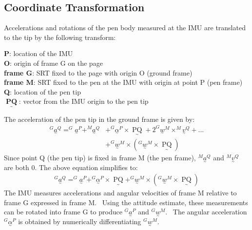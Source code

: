 \documentclass{article}
\newcommand{\nosymbol}{}
\newcommand{\tmop}[1]{\ensuremath{\operatorname{#1}}}
\begin{document}
\subsection{Coordinate Transformation}
Accelerations and rotations of the pen body measured at the IMU are translated to the tip by the following transform:

\textbf{P}: location of the IMU \\
\textbf{O}: origin of frame G on the page \\
\textbf{frame G}: SRT fixed to the page with origin O (ground frame) \\
\textbf{frame M}: SRT fixed to the pen at the IMU with origin at point P (pen frame) \\
\textbf{Q}: location of the pen tip \\
$\underset{\mbox{\textasciitilde}}{\tmop{\textbf{PQ}}}$: vector from the IMU origin to
the pen tip

The acceleration of the pen tip in the ground frame is given by:
\begin{align*}
  ^G \underset{\mbox{\textasciitilde}}{a}^Q =^G
  \underset{\mbox{\textasciitilde}}{a}^P +^M
  \underset{\mbox{\textasciitilde}}{a}^Q &+^G
  \underset{\mbox{\textasciitilde}}{\alpha}^P \times
  \underset{\mbox{\textasciitilde}}{\tmop{PQ}} + 2^G
  \underset{\mbox{\textasciitilde}}{w}^M \times^M
  \underset{\mbox{\textasciitilde}}{v}^Q + ... \\ &+ ^G 
  \underset{\mbox{\textasciitilde}}{w}^M \times \left(^G
  \underset{\mbox{\textasciitilde}}{w}^M \times
  \underset{\mbox{\textasciitilde}}{\tmop{PQ}} \right)
\end{align*}
Since point Q (the pen tip) is fixed in frame M (the pen frame), $^M
\underset{\mbox{\textasciitilde}}{a}^Q$ and $^M
\underset{\mbox{\textasciitilde}}{v}^Q$ are both 0. The above equation simplifies to:
\begin{eqnarray*}
  & ^G \underset{\mbox{\textasciitilde}}{a}^Q =^G
  \underset{\mbox{\textasciitilde}}{a}^P +^G
  \underset{\mbox{\textasciitilde}}{\alpha}^P \times
  \underset{\mbox{\textasciitilde}}{\tmop{PQ}} +^G
  \underset{\mbox{\textasciitilde}}{w}^M \times \left(^G
  \underset{\mbox{\textasciitilde}}{w}^M \times
  \underset{\mbox{\textasciitilde}}{\tmop{PQ}} \right) & 
\end{eqnarray*}
The IMU measures accelerations and angular velocities of frame M relative to frame G expressed in frame M. \ Using the attitude estimate, these measurements can be rotated into frame G to produce $^G
\underset{\mbox{\textasciitilde}}{a}^P$ and $^G
\underset{\mbox{\textasciitilde}}{w}^M \nosymbol$. \ The angular acceleration
$^G \underset{\mbox{\textasciitilde}}{\alpha}^P$ is obtained by numerically
differentiating $^G \underset{\mbox{\textasciitilde}}{w}^M$.
\end{document}
